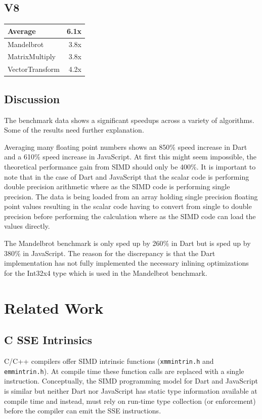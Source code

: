 \documentclass[preprint]{sigplanconf}
\begin{document}
\subsection{V8}
\begin{tabular}{|l|r|}
\hline
 Average & 6.1x \\
 \hline
 Mandelbrot & 3.8x \\
 \hline
 MatrixMultiply & 3.8x \\
 \hline
 VectorTransform & 4.2x \\
 \hline
\end{tabular}

\subsection{Discussion}

The benchmark data shows a significant speedups across a variety of algorithms.
Some of the results need further explanation.

Averaging many floating point numbers shows an 850\% speed increase in Dart and
a 610\% speed increase in JavaScript. At first this might seem impossible, the
theoretical performance gain from SIMD should only be 400\%. It is important to
note that in the case of Dart and JavaScript that the scalar code is performing
double precision arithmetic where as the SIMD code is performing single
precision. The data is being loaded from an array holding single precision
floating point values resulting in the scalar code having to convert from single
to double precision before performing the calculation where as the SIMD code can
load the values directly.

The Mandelbrot benchmark is only sped up by 260\% in Dart but is sped up by
380\% in JavaScript. The reason for the discrepancy is that the Dart
implementation has not fully implemented the necessary inlining optimizations
for the Int32x4 type which is used in the Mandelbrot benchmark.

\section{Related Work}

\subsection{C SSE Intrinsics}

C/C++ compilers offer SIMD intrinsic functions (\verb!xmmintrin.h! and
\verb!emmintrin.h!). At compile time these function calls are replaced with a
single instruction. Conceptually, the SIMD programming model for Dart and
JavaScript is similar but neither Dart nor JavaScript has static type
information available at compile time and instead, must rely on run-time type
collection (or enforcement) before the compiler can emit the SSE instructions.
\end{document}
